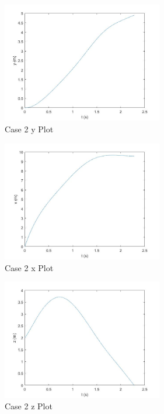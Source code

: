 \documentclass[12pt,twoside,letterpaper]{article}
\begin{document}
\begin{multicols}{3}

\begin{figure}[H]
\centering
\includegraphics[width=7cm]{figures/case_2_y.jpg}
\caption{Case 2 y Plot}
\label{Case 2 y Plot}

\end{figure}
\begin{figure}[H]
\centering
\includegraphics[width=7cm]{figures/case_2_x.jpg}
\caption{Case 2 x Plot}
\label{Case 2 x Plot}
\end{figure}
\begin{figure}[H]
\centering
\includegraphics[width=7cm]{figures/case_2_z.jpg}
\caption{Case 2 z Plot}
\label{Case 2 z Plot}
\end{figure}

\end{multicols}
\newpage
\end{document}
